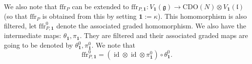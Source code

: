\documentclass{amsart}
\newtheorem{Lem}[Thm]{Lemma}
\theoremstyle{definition}
\newcommand{\sss}{\subsubsection{}}
\newcommand{\g}{\mathfrak{g}}
\newcommand{\gr}{\operatorname{gr}}
\newcommand{\ffr}{\mathrm{ffr}}
\newcommand{\lf}{\mathfrak{l}}
\newcommand{\Jet}{\mathscr{J}}
\newcommand{\CDO}{\mathrm{CDO}}
\newcommand{\bone}{\mathbf{1}}
\numberwithin{equation}{section}
\begin{document}
\sss\label{SSS:ffr_deformed} We also note that $\ffr_P$ can be extended to $\ffr_{P,\bone}:V_{\bone}(\g)\rightarrow \CDO(N)\otimes V_{\bone}(\lf)$ (so that $\ffr_P$ is obtained from this by setting $\mathbf{1}:=\kappa$). This homomorphism is also filtered, let $\ffr_{P,\bone}^0$ denote the associated graded homomorphism.  We also have the intermediate maps: $\theta_{\bone}, \pi_{\bone}$. They are filtered and their associated graded maps are going to be denoted by  
$\theta_{\bone}^0,  \pi_{\bone}^0$. We note that 
\begin{equation}\label{eq:ffr0_formula}
\ffr_{P,\bone}^0=(\operatorname{id}\otimes \operatorname{id}\otimes \pi_{\bone}^0)\circ \theta_{\bone}^0.
\end{equation}
%


 

%
%
%
%
\end{document}
